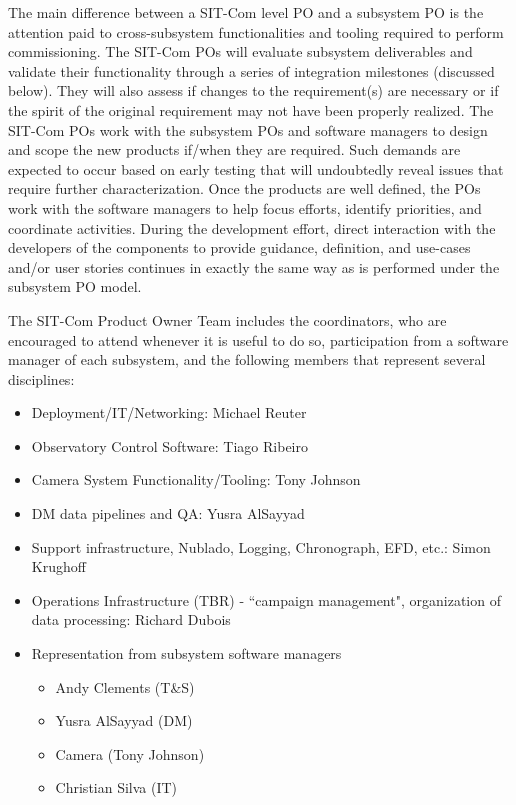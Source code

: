 \documentclass[SE,lsstdraft,authoryear,toc]{lsstdoc}
\begin{document}
The main difference between a SIT-Com level PO and a subsystem PO is the attention paid to cross-subsystem functionalities and tooling required to perform commissioning.
The SIT-Com POs will evaluate subsystem deliverables and validate their functionality through a series of integration milestones (discussed below).
They will also assess if changes to the requirement(s) are necessary or if the spirit of the original requirement may not have been properly realized.
The SIT-Com POs work with the subsystem POs and software managers to design and scope the new products if/when they are required.
Such demands are expected to occur based on early testing that will undoubtedly reveal issues that require further characterization.
Once the products are well defined, the POs work with the software managers to help focus efforts, identify priorities, and coordinate activities.
During the development effort, direct interaction with the developers of the components to provide guidance, definition, and use-cases and/or user stories continues in exactly the same way as is performed under the subsystem PO model.

The SIT-Com Product Owner Team includes the coordinators, who are encouraged to attend whenever it is useful to do so, participation from a software manager of each subsystem, and the following members that represent several disciplines:

\begin{itemize}
    \item Deployment/IT/Networking: Michael Reuter
    \item Observatory Control Software: Tiago Ribeiro
    \item Camera System Functionality/Tooling: Tony Johnson
    \item DM data pipelines and QA: Yusra AlSayyad
    \item Support infrastructure, Nublado, Logging, Chronograph, EFD, etc.: Simon Krughoff
    \item Operations Infrastructure (TBR) -  ``campaign management", organization of data processing: Richard Dubois
    \item Representation from subsystem software managers
    \begin{itemize}
        \item Andy Clements (T\&S)
        \item Yusra AlSayyad (DM)
        \item Camera (Tony Johnson)
        \item Christian Silva (IT)
    \end{itemize}

\end{itemize}
\end{document}
